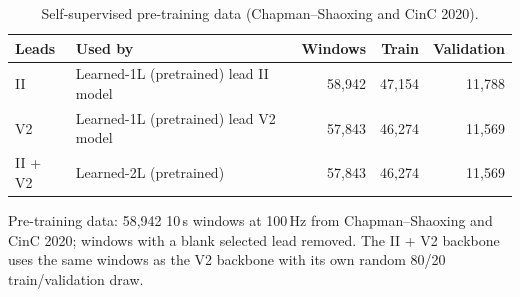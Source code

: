 \begin{table}[htbp]
\centering
\small
\caption{Self-supervised pre-training data (Chapman--Shaoxing and CinC 2020).}
\label{tab:t0_pretraining}
\begin{tabular}{llrrr}
\toprule
Leads & Used by & Windows & Train & Validation \\
\midrule
II & Learned-1L (pretrained) lead II model & 58{,}942 & 47{,}154 & 11{,}788 \\
V2 & Learned-1L (pretrained) lead V2 model & 57{,}843 & 46{,}274 & 11{,}569 \\
II + V2 & Learned-2L (pretrained) & 57{,}843 & 46{,}274 & 11{,}569 \\
\bottomrule
\end{tabular}

\par\smallskip\footnotesize Pre-training data: 58{,}942 10\,s windows at 100\,Hz from Chapman--Shaoxing and CinC 2020; windows with a blank selected lead removed. The II + V2 backbone uses the same windows as the V2 backbone with its own random 80/20 train/validation draw.
\end{table}
